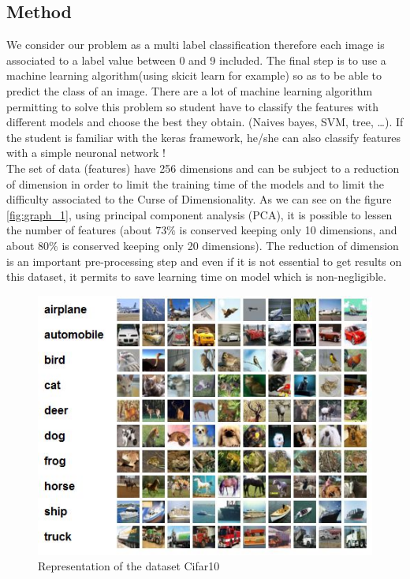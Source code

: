 \documentclass[10pt, a4paper, twocolumn]{article} %
\begin{document}
\subsection{Method}
We consider our problem as a multi label classification therefore each image is associated to a label value between 0 and 9 included. The final step is to use a machine learning algorithm(using skicit learn for example) so as to be able to predict the class of an image. There are a lot of machine learning algorithm permitting to solve this problem so student have to classify the features with different models and choose the best they obtain. (Naives bayes, SVM, tree, …).
If the student is familiar with the keras framework, he/she can also classify features with a simple neuronal network ! \\The set of data (features) have 256 dimensions and can be subject to a reduction of dimension in order to limit the training time of the models and to limit the difficulty associated to the Curse of Dimensionality. As we can see on the figure \ref{fig:graph_1}, using  principal component analysis (PCA), it is possible to lessen the number of features (about $73\%$ is conserved keeping only 10 dimensions, and about $80\%$ is conserved keeping only 20 dimensions). The reduction of dimension is an important pre-processing step and even if it is not essential to get
results on this dataset, it permits to save learning time on model which is non-negligible.
\\
\begin{figure}[H]
	\includegraphics[width=\linewidth]{cifar10.jpg} %
	\caption{\label{fig:cifar10}Representation of the dataset Cifar10}
\end{figure}
\end{document}
